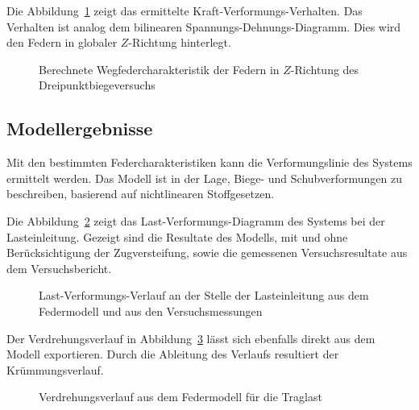 \documentclass[
  11pt,
  letterpaper,
]{scrreprt}
\begin{document}
Die Abbildung~\ref{fig-wegfeder-schub-a3v2} zeigt das ermittelte
Kraft-Verformungs-Verhalten. Das Verhalten ist analog dem bilinearen
Spannungs-Dehnungs-Diagramm. Dies wird den Federn in globaler
\(Z\)-Richtung hinterlegt.

\begin{figure}[H]


\caption{\label{fig-wegfeder-schub-a3v2}Berechnete
Wegfedercharakteristik der Federn in \(Z\)-Richtung des
Dreipunktbiegeversuchs}

\end{figure}%

\subsection{Modellergebnisse}\label{modellergebnisse}

Mit den bestimmten Federcharakteristiken kann die Verformungslinie des
Systems ermittelt werden. Das Modell ist in der Lage, Biege- und
Schubverformungen zu beschreiben, basierend auf nichtlinearen
Stoffgesetzen.

Die Abbildung~\ref{fig-fwa3v2} zeigt das Last-Verformungs-Diagramm des
Systems bei der Lasteinleitung. Gezeigt sind die Resultate des Modells,
mit und ohne Berücksichtigung der Zugversteifung, sowie die gemessenen
Versuchsresultate aus dem Versuchsbericht.

\begin{figure}[H]


\caption{\label{fig-fwa3v2}Last-Verformungs-Verlauf an der Stelle der
Lasteinleitung aus dem Federmodell und aus den Versuchsmessungen}

\end{figure}%

Der Verdrehungsverlauf in Abbildung~\ref{fig-phi-max-a3v2} lässt sich
ebenfalls direkt aus dem Modell exportieren. Durch die Ableitung des
Verlaufs resultiert der Krümmungsverlauf.

\begin{figure}[H]


\caption{\label{fig-phi-max-a3v2}Verdrehungsverlauf aus dem Federmodell
für die Traglast}

\end{figure}%
\end{document}
